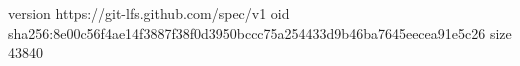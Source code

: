 version https://git-lfs.github.com/spec/v1
oid sha256:8e00c56f4ae14f3887f38f0d3950bccc75a254433d9b46ba7645eecea91e5c26
size 43840
